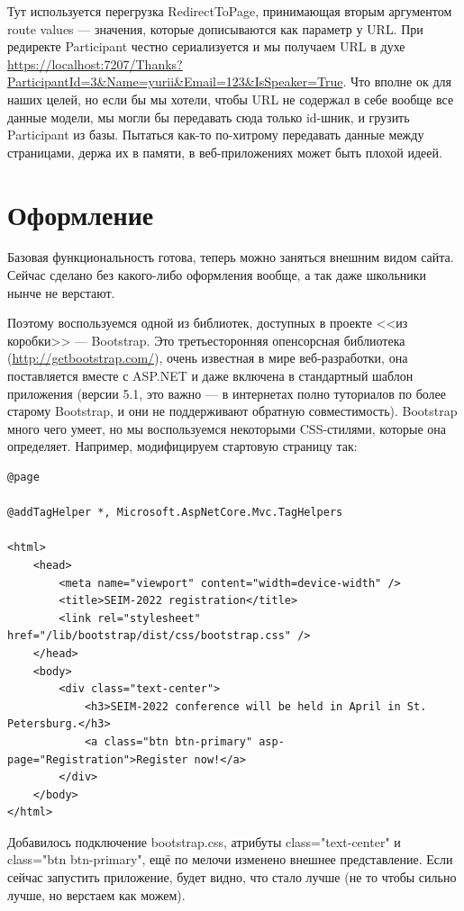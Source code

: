 \documentclass[a5paper]{article}
\begin{document}
Тут используется перегрузка RedirectToPage, принимающая вторым аргументом route values --- значения, которые дописываются как параметр у URL. При редиректе Participant честно сериализуется и мы получаем URL в духе \url{https://localhost:7207/Thanks?ParticipantId=3&Name=yurii&Email=123&IsSpeaker=True}. Что вполне ок для наших целей, но если бы мы хотели, чтобы URL не содержал в себе вообще все данные модели, мы могли бы передавать сюда только id-шник, и грузить Participant из базы. Пытаться как-то по-хитрому передавать данные между страницами, держа их в памяти, в веб-приложениях может быть плохой идеей.

\section{Оформление}

Базовая функциональность готова, теперь можно заняться внешним видом сайта. Сейчас сделано без какого-либо оформления вообще, а так даже школьники нынче не верстают. 

Поэтому воспользуемся одной из библиотек, доступных в проекте <<из коробки>> --- Bootstrap. Это третьесторонняя опенсорсная библиотека (\url{http://getbootstrap.com/}), очень известная в мире веб-разработки, она поставляется вместе с ASP.NET и даже включена в стандартный шаблон приложения (версии 5.1, это важно --- в интернетах полно туториалов по более старому Bootstrap, и они не поддерживают обратную совместимость). Bootstrap много чего умеет, но мы воспользуемся некоторыми CSS-стилями, которые она определяет. Например, модифицируем
стартовую страницу так:

\begin{verbatim}
@page

@addTagHelper *, Microsoft.AspNetCore.Mvc.TagHelpers

<html>
    <head>
        <meta name="viewport" content="width=device-width" />
        <title>SEIM-2022 registration</title>
        <link rel="stylesheet" href="/lib/bootstrap/dist/css/bootstrap.css" />
    </head>
    <body>
        <div class="text-center">
            <h3>SEIM-2022 conference will be held in April in St. Petersburg.</h3>
            <a class="btn btn-primary" asp-page="Registration">Register now!</a>
        </div>
    </body>
</html>
\end{verbatim}

Добавилось подключение bootstrap.css, атрибуты class="text-center" и class="btn btn-primary", ещё по мелочи изменено внешнее представление. Если сейчас запустить приложение, будет видно, что стало лучше (не то чтобы сильно лучше, но верстаем как можем).
\end{document}
